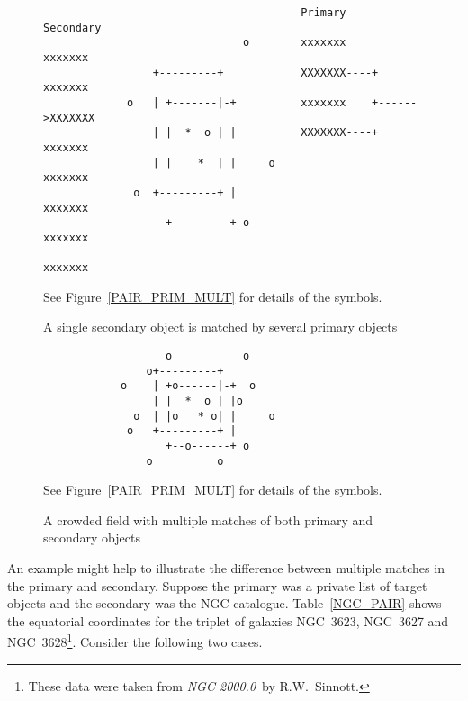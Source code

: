 \documentclass[twoside,11pt]{article}
\renewcommand{\_}{\texttt{\symbol{95}}}
\begin{document}
\begin{figure}[htbp]

\begin{verbatim}
                                        Primary           Secondary
                               o        xxxxxxx            xxxxxxx
                 +---------+            XXXXXXX----+       xxxxxxx
             o   | +-------|-+          xxxxxxx    +------>XXXXXXX
                 | |  *  o | |          XXXXXXX----+       xxxxxxx
                 | |    *  | |     o                       xxxxxxx
              o  +---------+ |                             xxxxxxx
                   +---------+ o                           xxxxxxx
                                                           xxxxxxx
\end{verbatim}

\begin{center}
See Figure~\ref{PAIR_PRIM_MULT} for details of the symbols.
\end{center}

\caption{A single secondary object is matched by several primary
objects \label{PAIR_SEC_MULT} }

\end{figure}

\begin{figure}[htbp]

\begin{verbatim}
                   o           o
                o+---------+
            o    | +o------|-+  o
                 | |  *  o | |o
              o  | |o   * o| |     o
             o   +---------+ |
                   +--o------+ o
                o          o
\end{verbatim}

\begin{center}
See Figure~\ref{PAIR_PRIM_MULT} for details of the symbols.
\end{center}

\caption{A crowded field with multiple matches of both primary and
secondary objects \label{PAIR_CROWD} }

\end{figure}

An example might help to illustrate the difference between multiple
matches in the primary and secondary. Suppose the primary was a private
list of target objects and the secondary was the NGC catalogue.
Table~\ref{NGC_PAIR} shows the equatorial coordinates for the triplet of
galaxies NGC~3623, NGC~3627 and NGC~3628\footnote{These data were taken
from {\it NGC 2000.0}\, by R.W.~Sinnott\cite{NGC2000}.}. Consider the
following two cases.
\end{document}
